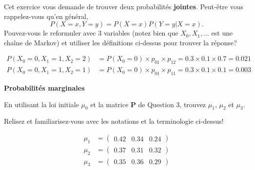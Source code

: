 \begin{Exercice}[15 minutes]
\begin{conseil}
    Cet exercice vous demande de trouver deux probabilités \textbf{jointes}. Peut-être vous rappelez-vous qu'en général, 
    \[ 
    P(X=x, Y=y) = P(X=x)P(Y=y|X=x).
    \]
    Pouvez-vous le reformuler avec 3 variables (notez bien que $X_0, X_1, ...$ est une chaîne de Markov) et utiliser les définitions ci-dessus pour trouver la réponse?  
\end{conseil}
\begin{solution}
\begin{align}
    P(X_0=0,X_1=1, X_2=2) &= P(X_0 =0)\times p_{01} \times p_{12} = 0.3 \times 0.1 \times 0.7 = 0.021\\
     P(X_0=0,X_1=1, X_2=1)&=P(X_0 =0)\times p_{01} \times p_{11} = 0.3 \times 0.1\times 0.1 = 0.003
\end{align}
\end{solution}
\end{Exercice}

\begin{Exercice}[7 minutes]\textbf{Probabilités marginales}

En utilisant la loi initiale $\mu_0$ et la matrice \textbf{P} de Question 3, trouvez $\mu_1$, $\mu_2$ et $\mu_3$.

\begin{conseil}
    Relisez et familiarisez-vous avec les notations et la terminologie ci-dessus!
\end{conseil}
    
\begin{solution}
\begin{align}
\mu_1 &=
\left(\begin{matrix}
0.42 & 0.34 & 0.24
\end{matrix}\right)\\
\mu_2 &= 
\left(\begin{matrix}
0.37 & 0.31 & 0.32
\end{matrix}\right) \\
\mu_3 &= \left(\begin{matrix}
0.35 & 0.36 & 0.29
\end{matrix}\right)
\end{align}
\end{solution}

\end{Exercice}

